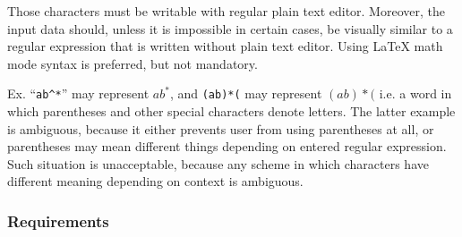 \documentclass{article}
\begin{document}
Those characters must be writable with regular plain text editor. Moreover, the input data should,
unless it is impossible in certain cases, be visually similar to a regular expression that is
written without plain text editor. Using \LaTeX{} math mode syntax is preferred, but not
mandatory.

Ex. ``\verb|ab^*|'' may represent $ab^*$, and \verb|(ab)*(| may represent $(ab)\ast($ i.e. a word
in which parentheses and other special characters denote letters. The latter example is ambiguous,
because it either prevents user from using parentheses at all, or parentheses may mean different
things depending on entered regular expression. Such situation is unacceptable, because any
scheme in which characters have different meaning depending on context is ambiguous.

\subsubsection*{Requirements}
\end{document}
